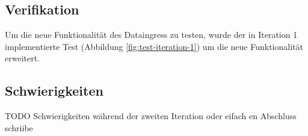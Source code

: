 \subsection{Verifikation}

Um die neue Funktionalität des Dataingress zu testen, wurde der in Iteration 1
implementierte Test (Abbildung \ref{fig:test-iteration-1}) um die neue Funktionalität
erweitert.

\subsection{Schwierigkeiten}
TODO Schwierigkeiten während der zweiten Iteration oder eifach en Abschluss schriibe
